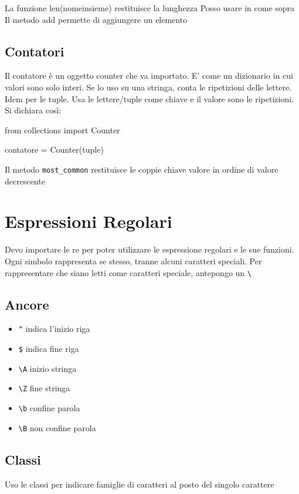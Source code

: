 La funzione len(nomeinsieme) restituisce la lunghezza
Posso usare in come sopra\\
Il metodo add permette di aggiungere un elemento\\

\section{Contatori}
Il contatore è un oggetto counter che va importato. E' come un dizionario in cui valori sono solo interi. Se lo uso su una stringa, conta le ripetizioni delle lettere. Idem per le tuple. Usa le lettere/tuple come chiave e il valore sono le ripetizioni. Si dichiara così:

\begin{py}
from collections import Counter 

contatore = Counter(tuple)
\end{py}

Il metodo \verb|most_common| restituisce le coppie chiave valore in ordine di valore decrescente

\chapter{Espressioni Regolari}
Devo importare le re per poter utilizzare le espressione regolari e le sue funzioni. Ogni simbolo rappresenta se stesso, tranne alcuni caratteri speciali. Per rappresentare che siano letti come caratteri speciale, antepongo un \verb|\|

\section{Ancore}
\begin{itemize}
\item \verb|^| indica l'inizio riga
\item \verb|$| indica fine riga
\item \verb|\A| inizio stringa
\item \verb|\Z| fine stringa
\item \verb|\b| confine parola
\item \verb|\B| non confine parola
\end{itemize}

\section{Classi}
Uso le classi per indicare famiglie di caratteri al posto del singolo carattere

